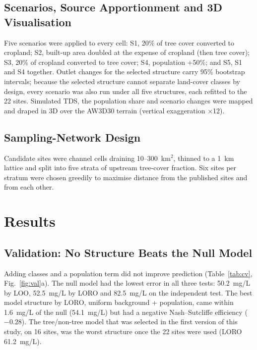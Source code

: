 \documentclass[10pt,twocolumn,letterpaper]{article}
\begin{document}
\subsection{Scenarios, Source Apportionment and 3D Visualisation}
Five scenarios were applied to every cell: S1, 20\% of tree cover converted to cropland; S2, built-up area doubled at the expense of cropland (then tree cover); S3, 20\% of cropland converted to tree cover; S4, population +50\%; and S5, S1 and S4 together. Outlet changes for the selected structure carry 95\% bootstrap intervals; because the selected structure cannot separate land-cover classes by design, every scenario was also run under all five structures, each refitted to the 22 sites. Simulated TDS, the population share and scenario changes were mapped and draped in 3D over the AW3D30 terrain (vertical exaggeration $\times$12).

\subsection{Sampling-Network Design}
Candidate sites were channel cells draining 10--300~km$^2$, thinned to a 1~km lattice and split into five strata of upstream tree-cover fraction. Six sites per stratum were chosen greedily to maximise distance from the published sites and from each other.

\section{Results}
\subsection{Validation: No Structure Beats the Null Model}
Adding classes and a population term did not improve prediction (Table~\ref{tab:cv}, Fig.~\ref{fig:val}a). The null model had the lowest error in all three tests: 50.2~mg/L by LOO, 52.5~mg/L by LORO and 82.5~mg/L on the independent test. The best model structure by LORO, uniform background + population, came within 1.6~mg/L of the null (54.1~mg/L) but had a negative Nash--Sutcliffe efficiency ($-0.28$). The tree/non-tree model that was selected in the first version of this study, on 16 sites, was the worst structure once the 22 sites were used (LORO 61.2~mg/L).
\end{document}
